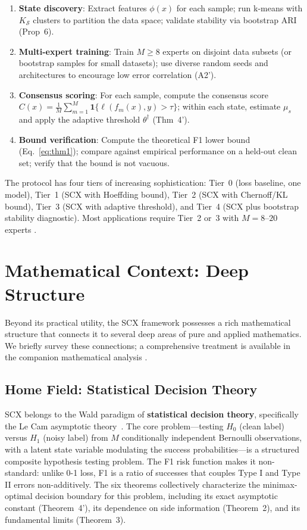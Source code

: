 \documentclass[twocolumn]{article}
\theoremstyle{definition}
\begin{document}
\begin{enumerate}[nosep,leftmargin=*,itemsep=2pt]
  \item \textbf{State discovery}: Extract features $\phi(x)$ for each sample; run k-means with $K_{\mathcal{S}}$ clusters to partition the data space; validate stability via bootstrap ARI (Prop~6).
  \item \textbf{Multi-expert training}: Train $M \geq 8$ experts on disjoint data subsets (or bootstrap samples for small datasets); use diverse random seeds and architectures to encourage low error correlation (A2').
  \item \textbf{Consensus scoring}: For each sample, compute the consensus score $C(x) = \frac{1}{M}\sum_{m=1}^M \mathbf{1}\{\ell(f_m(x), y) > \tau\}$; within each state, estimate $\mu_s$ and apply the adaptive threshold $\theta^\dagger$ (Thm~4').
  \item \textbf{Bound verification}: Compute the theoretical F1 lower bound (Eq.~\ref{eq:thm1}); compare against empirical performance on a held-out clean set; verify that the bound is not vacuous.
\end{enumerate}

The protocol has four tiers of increasing sophistication: Tier~0 (loss baseline, one model), Tier~1 (SCX with Hoeffding bound), Tier~2 (SCX with Chernoff/KL bound), Tier~3 (SCX with adaptive threshold), and Tier~4 (SCX plus bootstrap stability diagnostic). Most applications require Tier~2 or~3 with $M=8$--$20$ experts \cite{engineering_guide}.

\section{Mathematical Context: Deep Structure}

Beyond its practical utility, the SCX framework possesses a rich mathematical structure that connects it to several deep areas of pure and applied mathematics. We briefly survey these connections; a comprehensive treatment is available in the companion mathematical analysis \cite{deep_math}.

\subsection{Home Field: Statistical Decision Theory}

SCX belongs to the Wald paradigm of \textbf{statistical decision theory}, specifically the Le Cam asymptotic theory~\cite{lecam1986}. The core problem---testing $H_0$ (clean label) versus $H_1$ (noisy label) from $M$ conditionally independent Bernoulli observations, with a latent state variable modulating the success probabilities---is a structured composite hypothesis testing problem. The F1 risk function makes it non-standard: unlike 0-1 loss, F1 is a ratio of successes that couples Type I and Type II errors non-additively. The six theorems collectively characterize the minimax-optimal decision boundary for this problem, including its exact asymptotic constant (Theorem~4'), its dependence on side information (Theorem~2), and its fundamental limits (Theorem~3).
\end{document}
